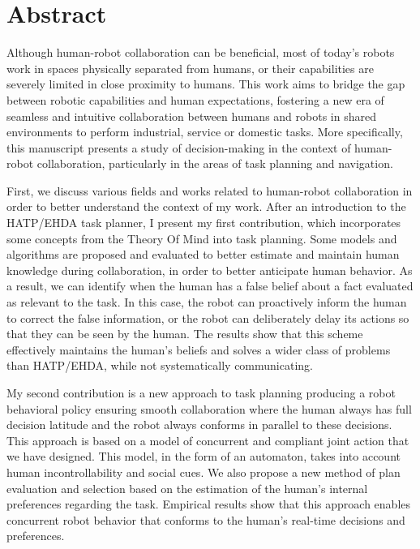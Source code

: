 \chapter*{Abstract}


Although human-robot collaboration can be beneficial, most of today's robots work in spaces physically separated from humans, or their capabilities are severely limited in close proximity to humans. This work aims to bridge the gap between robotic capabilities and human expectations, fostering a new era of seamless and intuitive collaboration between humans and robots in shared environments to perform industrial, service or domestic tasks. More specifically, this manuscript presents a study of decision-making in the context of human-robot collaboration, particularly in the areas of task planning and navigation.

First, we discuss various fields and works related to human-robot collaboration in order to better understand the context of my work. After an introduction to the HATP/EHDA task planner, I present my first contribution, which incorporates some concepts from the Theory Of Mind into task planning. Some models and algorithms are proposed and evaluated to better estimate and maintain human knowledge during collaboration, in order to better anticipate human behavior. As a result, we can identify when the human has a false belief about a fact evaluated as relevant to the task. In this case, the robot can proactively inform the human to correct the false information, or the robot can deliberately delay its actions so that they can be seen by the human. The results show that this scheme effectively maintains the human's beliefs and solves a wider class of problems than HATP/EHDA, while not systematically communicating.

My second contribution is a new approach to task planning producing a robot behavioral policy ensuring smooth collaboration where the human always has full decision latitude and the robot always conforms in parallel to these decisions. This approach is based on a model of concurrent and compliant joint action that we have designed. This model, in the form of an automaton, takes into account human incontrollability and social cues. We also propose a new method of plan evaluation and selection based on the estimation of the human's internal preferences regarding the task. Empirical results show that this approach enables concurrent robot behavior that conforms to the human's real-time decisions and preferences.

